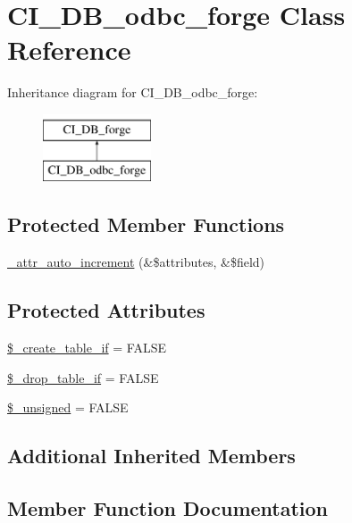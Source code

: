 \hypertarget{class_c_i___d_b__odbc__forge}{}\section{C\+I\+\_\+\+D\+B\+\_\+odbc\+\_\+forge Class Reference}
\label{class_c_i___d_b__odbc__forge}
Inheritance diagram for C\+I\+\_\+\+D\+B\+\_\+odbc\+\_\+forge\+:\begin{figure}[H]
\begin{center}
\leavevmode
\includegraphics[height=2.000000cm]{class_c_i___d_b__odbc__forge}
\end{center}
\end{figure}
\subsection*{Protected Member Functions}
\begin{DoxyCompactItemize}
\item 
\hyperlink{class_c_i___d_b__odbc__forge_a2a013a5932439c3c44f0dad3436525f7}{\+\_\+attr\+\_\+auto\+\_\+increment} (\&\$attributes, \&\$field)
\end{DoxyCompactItemize}
\subsection*{Protected Attributes}
\begin{DoxyCompactItemize}
\item 
\hyperlink{class_c_i___d_b__odbc__forge_a2f6484fcb8d1dc3eef67a637227cd583}{\$\+\_\+create\+\_\+table\+\_\+if} = F\+A\+L\+S\+E
\item 
\hyperlink{class_c_i___d_b__odbc__forge_a92a8a9145a7fc91e252e58d019373581}{\$\+\_\+drop\+\_\+table\+\_\+if} = F\+A\+L\+S\+E
\item 
\hyperlink{class_c_i___d_b__odbc__forge_aae977ae6d61fa183f0b25422b6ddc31c}{\$\+\_\+unsigned} = F\+A\+L\+S\+E
\end{DoxyCompactItemize}
\subsection*{Additional Inherited Members}


\subsection{Member Function Documentation}
\hypertarget{class_c_i___d_b__odbc__forge_a2a013a5932439c3c44f0dad3436525f7}{}
